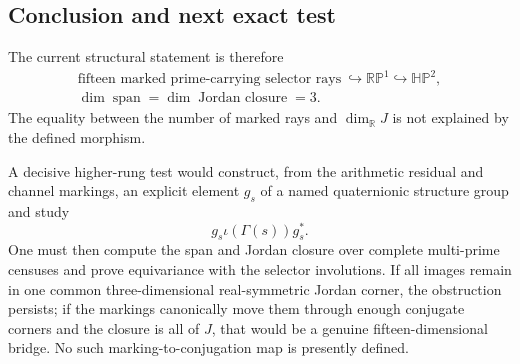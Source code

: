 \subsection{Conclusion and next exact test}

The current structural statement is therefore
\[
 \boxed{
 \begin{gathered}
 \text{fifteen marked prime-carrying selector rays}\ 
 \hookrightarrow\mathbb{RP}^1\hookrightarrow\mathbb{HP}^2,\\
 \dim\operatorname{span}=\dim\operatorname{Jordan\ closure}=3.
 \end{gathered}}
\]
The equality between the number of marked rays and $\dim_{\mathbb R}J$ is
not explained by the defined morphism.

A decisive higher-rung test would construct, from the arithmetic residual and
channel markings, an explicit element $g_s$ of a named quaternionic structure
group and study
\[
 g_s\iota(\Gamma(s))g_s^*.
\]
One must then compute the span and Jordan closure over complete multi-prime
censuses and prove equivariance with the selector involutions.  If all images
remain in one common three-dimensional real-symmetric Jordan corner, the
obstruction persists; if the markings canonically move them through enough
conjugate corners and the closure is all of $J$, that would be a genuine
fifteen-dimensional bridge.  No such
marking-to-conjugation map is presently defined.

